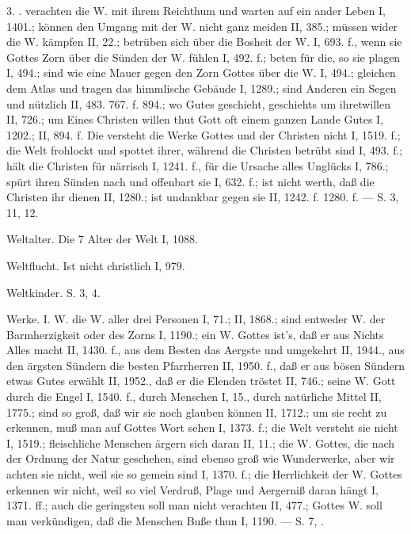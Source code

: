 3. .  verachten die W. mit ihrem Reichthum und warten auf ein ander Leben I, 1401.; können den Umgang mit der W. nicht ganz meiden II, 385.; müssen wider die W. kämpfen II, 22.; betrüben sich über die Bosheit der W. I, 693. f., wenn sie Gottes Zorn über die Sünden der W. fühlen I, 492. f.; beten für die, so sie plagen I, 494.; sind wie eine Mauer gegen den Zorn Gottes über die W. I, 494.; gleichen dem Atlas und tragen das himmlische Gebäude I, 1289.; sind Anderen ein Segen und nützlich II, 483. 767. f. 894.; wo Gutes geschieht, geschiehts um ihretwillen II, 726.; um Eines Christen willen thut Gott oft einem ganzen Lande Gutes I, 1202.; II, 894. f. Die  versteht die Werke Gottes und der Christen
nicht I, 1519. f.; die Welt frohlockt und spottet ihrer, während die Christen betrübt sind I, 493. f.; hält die Christen für närrisch I, 1241. f., für die Ursache alles Unglücks I, 786.; spürt ihren Sünden nach und offenbart sie I, 632. f.; ist nicht werth, daß die Christen ihr dienen II, 1280.; ist undankbar gegen sie II, 1242. f. 1280. f. — S.  3,  11, 12.

Weltalter. Die 7 Alter der Welt I, 1088.

Weltflucht. Ist nicht christlich I, 979.

Weltkinder. S.  3, 4.

Werke. I. W.  die W. aller drei Personen I, 71.; II, 1868.; sind entweder W. der Barmherzigkeit oder des Zorns I, 1190.; ein W. Gottes ist’s, daß er aus Nichts Alles macht II, 1430. f., aus dem Besten das Aergste und umgekehrt II, 1944., aus den ärgsten Sündern die besten Pfarrherren II, 1950. f., daß er aus bösen Sündern etwas Gutes erwählt II, 1952., daß er die Elenden tröstet II, 746.; seine W.  Gott  durch die Engel I, 1540. f., durch Menschen I, 15., durch natürliche Mittel II, 1775.; sind so groß, daß wir sie  noch glauben können II, 1712.; um sie recht zu erkennen, muß man auf Gottes Wort sehen I, 1373. f.; die Welt versteht sie nicht I, 1519.; fleischliche Menschen ärgern sich daran II, 11.; die W. Gottes, die nach der Ordnung der Natur geschehen, sind ebenso groß wie Wunderwerke, aber wir achten sie nicht, weil sie so gemein sind I, 1370. f.; die Herrlichkeit der W. Gottes erkennen wir nicht, weil so viel Verdruß, Plage und Aergerniß daran hängt I, 1371. ff.; auch die geringsten soll man nicht verachten II, 477.; Gottes W. soll man verkündigen, daß die Menschen Buße thun I, 1190. — S.  7, .

